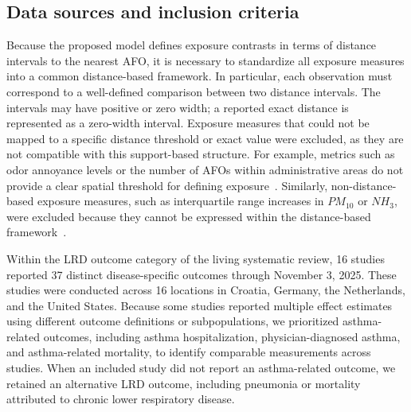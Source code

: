 \documentclass[journal=rsm]{CUP-JNL-DTM}%
\theoremstyle{definition}
\numberwithin{equation}{section}
\begin{document}
\subsection{Data sources and inclusion criteria}
\label{sec:data_sources}
 
Because the proposed model defines exposure contrasts in terms of distance intervals to the nearest AFO, it is necessary to standardize all exposure measures into a common distance-based framework. In particular, each observation must correspond to a well-defined comparison between two distance intervals. The intervals may have positive or zero width; a reported exact distance is represented as a zero-width interval. Exposure measures that could not be mapped to a specific distance threshold or exact value were excluded, as they are not compatible with this support-based structure. For example, metrics such as odor annoyance levels or the number of AFOs within administrative areas do not provide a clear spatial threshold for defining exposure~\cite{Radon2007, Hooiveld2016}. Similarly, non-distance-based exposure measures, such as interquartile range increases in $PM_{10}$ or $NH_3$, were excluded because they cannot be expressed within the distance-based framework~\cite{van_Kersen2020}.

 Within the LRD outcome category of the living systematic review, 16 studies
reported 37 distinct disease-specific outcomes through November 3, 2025.
These studies were conducted across 16 locations in Croatia, Germany, the
Netherlands, and the United States. Because some studies reported multiple
effect estimates using different outcome definitions or subpopulations, we
prioritized asthma-related outcomes, including asthma hospitalization,
physician-diagnosed asthma, and asthma-related mortality, to identify
comparable measurements across studies. When an included study did not report
an asthma-related outcome, we retained an alternative LRD outcome, including
pneumonia or mortality attributed to chronic lower respiratory disease.
\end{document}
